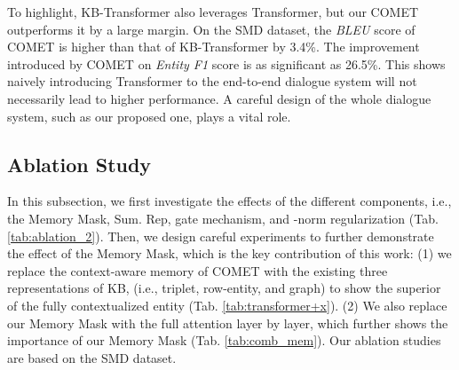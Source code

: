 \documentclass[11pt]{article}
\begin{document}
To highlight, KB-Transformer \cite{h-2019-kbtransformer} also leverages Transformer, but our COMET outperforms it by a large margin. On the SMD dataset, the \textit{BLEU} score of COMET is higher than that of KB-Transformer by 3.4\%. The improvement introduced by COMET on \textit{Entity F1} score is as significant as 26.5\%. This shows naively introducing Transformer to the end-to-end dialogue system will not necessarily lead to higher performance. A careful design of the whole dialogue system, such as our proposed one, plays a vital role.



\subsection{Ablation Study}
\label{ssec::ablation}
In this subsection, we first investigate the effects of the different components, i.e., the Memory Mask, Sum. Rep, gate mechanism, and -norm regularization (Tab. \ref{tab:ablation_2}). 
Then, we design careful experiments to further demonstrate the effect of the Memory Mask, which is the key contribution of this work:
(1) we replace the context-aware memory of COMET with the existing three representations of KB, (i.e., triplet, row-entity, and graph) to show the superior of the fully contextualized entity (Tab. \ref{tab:transformer+x}).
(2) We also replace our Memory Mask with the full attention layer by layer, which further shows the importance of our Memory Mask (Tab. \ref{tab:comb_mem}).
Our ablation studies are based on the SMD dataset.



\begin{table}[htb]
\centering

\caption{The effects of different components.}
\label{tab:ablation_2}
\end{table}
\end{document}
